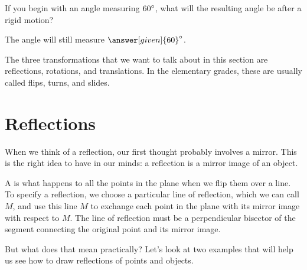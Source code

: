 \documentclass{ximera}
\begin{document}
\begin{question}
If you begin with an angle measuring $60\degree$, what will the resulting angle be after a rigid motion?

\begin{prompt}
The angle will still measure $\answer[given]{60}\degree$.
 \end{prompt}
\end{question}

The three transformations that we want to talk about in this section are reflections, rotations, and translations. In the elementary grades, these are usually called flips, turns, and slides.

\section{Reflections}
When we think of a reflection, our first thought probably involves a mirror. This is the right idea to have in our minds: a reflection is a mirror image of an object.
\begin{definition}
A  is what happens to all the points in the plane when we flip them over a line. To specify a reflection, we choose a particular line of reflection, which we can call $M$, and use this line $M$ to exchange each point in the plane with its mirror image with respect to $M$. The line of reflection must be a perpendicular bisector of the segment connecting the original point and its mirror image.
\end{definition}
 But what does that mean practically? Let's look at two examples that will help us see how to draw reflections of points and objects.
\end{document}
